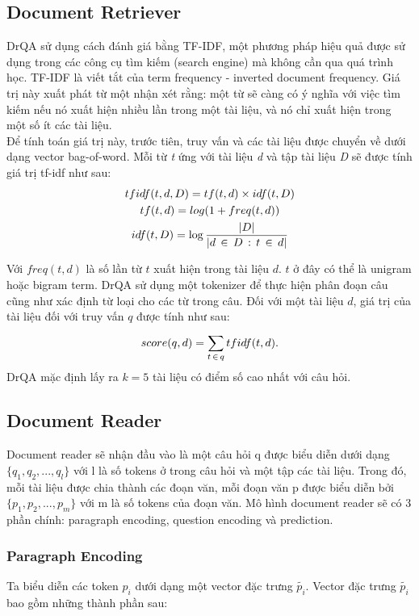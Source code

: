 \subsection{Document Retriever}
DrQA sử dụng cách đánh giá bằng TF-IDF, một phương pháp hiệu quả được sử dụng trong các công cụ tìm kiếm (search engine) mà không cần qua quá trình học. TF-IDF là viết tắt của term frequency - inverted document frequency. Giá trị này xuất phát từ một nhận xét rằng: một từ sẽ càng có ý nghĩa với việc tìm kiếm nếu nó xuất hiện nhiều lần trong một tài liệu, và nó chỉ xuất hiện trong một số ít các tài liệu.\\
Để tính toán giá trị này, trước tiên, truy vấn và  các tài liệu được chuyển về dưới dạng vector bag-of-word. Mỗi từ \textit{t} ứng với tài liệu \textit{d} và tập tài liệu \textit{D} sẽ được tính giá trị tf-idf như sau:
\begin{gather*}
    tfidf(t, d, D) = tf(t, d) \times idf(t, D) \\ 
    tf(t, d) = log(1 + freq(t, d))\\ 
    idf(t, D) = \log \frac{|D|}{|d \thinspace \in \thinspace D \thinspace : \thinspace t \thinspace \in \thinspace d|} 
\end{gather*}

Với $freq(t, d)$ là số lần từ $t$ xuất hiện trong tài liệu $d$. $t$ ở đây có thể là unigram hoặc bigram term.
DrQA sử dụng một tokenizer để thực hiện phân đoạn câu cũng như xác định từ loại cho các từ trong câu. Đối với một tài liệu $d$, giá trị của tài liệu đối với truy vấn $q$ được tính như sau:
\begin{gather*}
    score(q, d) = \sum_{t \thinspace \in \thinspace q}^{} tfidf(t, d).    
\end{gather*}
DrQA mặc định lấy ra $k = 5$ tài liệu có điểm số cao nhất với câu hỏi.


\subsection{Document Reader}
Document reader sẽ nhận đầu vào là một câu hỏi q được biểu diễn dưới dạng $ \{q_1, q_2, ..., q_l\} $ với l là số tokens ở trong câu hỏi và một tập các tài liệu. Trong đó, mỗi tài liệu được chia thành các đoạn văn, mỗi đoạn văn p được biểu diễn bởi  $\{p_1, p_2, ..., p_m\} $ với m là số tokens của đoạn văn. Mô hình document reader sẽ có 3 phần chính: paragraph encoding, question encoding và prediction.

\subsubsection{Paragraph Encoding}
Ta biểu diễn các token $p_i$ dưới dạng một vector đặc trưng $\tilde{p_i}$. Vector đặc trưng $\tilde{p_i}$  bao gồm những thành phần sau:

